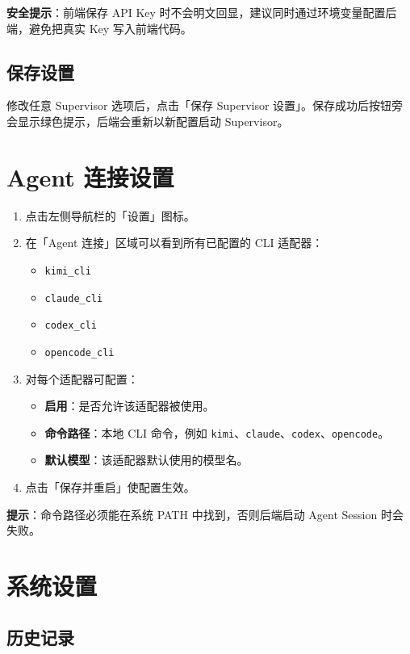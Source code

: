 \documentclass[12pt,a4paper]{article}
\begin{document}
\textbf{安全提示}：前端保存 API Key 时不会明文回显，建议同时通过环境变量配置后端，避免把真实 Key 写入前端代码。

\subsection{保存设置}

修改任意 Supervisor 选项后，点击「保存 Supervisor 设置」。保存成功后按钮旁会显示绿色提示，后端会重新以新配置启动 Supervisor。

\section{Agent 连接设置}

\begin{enumerate}
  \item 点击左侧导航栏的「设置」图标。
  \item 在「Agent 连接」区域可以看到所有已配置的 CLI 适配器：
  \begin{itemize}
    \item \texttt{kimi\_cli}
    \item \texttt{claude\_cli}
    \item \texttt{codex\_cli}
    \item \texttt{opencode\_cli}
  \end{itemize}
  \item 对每个适配器可配置：
  \begin{itemize}
    \item \textbf{启用}：是否允许该适配器被使用。
    \item \textbf{命令路径}：本地 CLI 命令，例如 \texttt{kimi}、\texttt{claude}、\texttt{codex}、\texttt{opencode}。
    \item \textbf{默认模型}：该适配器默认使用的模型名。
  \end{itemize}
  \item 点击「保存并重启」使配置生效。
\end{enumerate}

\textbf{提示}：命令路径必须能在系统 PATH 中找到，否则后端启动 Agent Session 时会失败。

\section{系统设置}

\subsection{历史记录}
\end{document}
